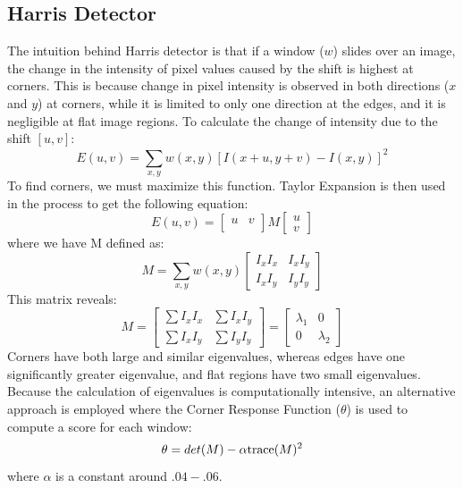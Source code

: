 \documentclass{article}
\begin{document}
\subsection{Harris Detector}
The intuition behind Harris detector is that if a window ($w$) slides over an image, the change in the intensity of pixel values caused by the shift is highest at corners. This is because change in pixel intensity is observed in both directions ($x$ and $y$) at corners, while it is limited to only one direction at the edges, and it is negligible at flat image regions.  To calculate the change of intensity due to the shift $[u,v]$:
$$E(u,v) = \sum_{x,y}^{} w(x,y)[I(x+u,y+v)-I(x,y)]^2$$
To find corners, we must maximize this function. Taylor Expansion is then used in the process to get the following equation:
\[
E(u,v)=
  \begin{bmatrix}
    u & v\\
  \end{bmatrix}
  M
  \begin{bmatrix}
      u \\
      v
    \end{bmatrix}
\]
where we have M defined as:
\[M =
\sum_{x,y}^{} w(x,y)
  \begin{bmatrix}
      I_x I_x & I_x I_y\\
      I_x I_y & I_y I_y
    \end{bmatrix}
\]
This matrix reveals:
\[M =
  \begin{bmatrix}
      \sum I_x I_x & \sum I_x I_y\\
      \sum I_x I_y & \sum I_y I_y
    \end{bmatrix}
    =
    \begin{bmatrix}
      \lambda_1 & 0\\
      0 & \lambda_2
    \end{bmatrix}
\]
Corners have both large and similar eigenvalues, whereas edges have one significantly greater eigenvalue, and flat regions have two small eigenvalues. Because the calculation of eigenvalues is computationally intensive, an alternative approach is employed where the Corner Response Function ($\theta$) is used to compute a score for each window:
$$\theta = det(M) - \alpha \textnormal{trace} (M)^2 $$
where $\alpha$ is a constant around $.04-.06$.
\end{document}
